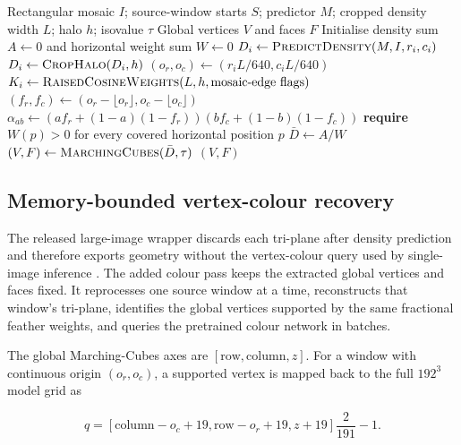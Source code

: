 \begin{algorithm}[H]
\caption{Fractional feather fusion of overlapping density predictions}
\label{alg:fractional-density-fusion}
\begin{algorithmic}[1]
\Require Rectangular mosaic $I$; source-window starts $S$; predictor $M$;
cropped density width $L$; halo $h$; isovalue $\tau$
\Ensure Global vertices $V$ and faces $F$
\State Initialise density sum $A\gets 0$ and horizontal weight sum $W\gets 0$
  \State $D_i\gets\Call{PredictDensity}{M,I,r_i,c_i}$
  \State $D_i\gets\Call{CropHalo}{D_i,h}$
  \State $(o_{r},o_{c})\gets(r_iL/640,c_iL/640)$
  \State $K_i\gets\Call{RaisedCosineWeights}{L,h,\text{mosaic-edge flags}}$
  \State $(f_r,f_c)\gets(o_r-\lfloor o_r\rfloor,o_c-\lfloor o_c\rfloor)$
    \State $\alpha_{ab}\gets(af_r+(1-a)(1-f_r))(bf_c+(1-b)(1-f_c))$
    \State {}
    \State {}
  \EndFor
\EndFor
\State \textbf{require} $W(p)>0$ for every covered horizontal position $p$
\State $\bar D\gets A/W$ 
\State $(V,F)\gets\Call{MarchingCubes}{\bar D,\tau}$
\State \Return $(V,F)$
\end{algorithmic}
\end{algorithm}

\subsection{Memory-bounded vertex-colour recovery}

The released large-image wrapper discards each tri-plane after density
prediction and therefore exports geometry without the vertex-colour query used
by single-image inference \cite{qianSat3DGenCode2026}.  The added colour pass
keeps the extracted global vertices and faces fixed.  It reprocesses one source
window at a time, reconstructs that window's tri-plane, identifies the global
vertices supported by the same fractional feather weights, and queries the
pretrained colour network in batches.

The global Marching-Cubes axes are $[\mathrm{row},\mathrm{column},z]$.  For a
window with continuous origin $(o_r,o_c)$, a supported vertex is mapped back to
the full $192^3$ model grid as

\begin{equation}
q=\left[\mathrm{column}-o_c+19,
         \mathrm{row}-o_r+19,
         z+19\right]\frac{2}{191}-1.
\label{eq:large-image-colour-coordinate}
\end{equation}

